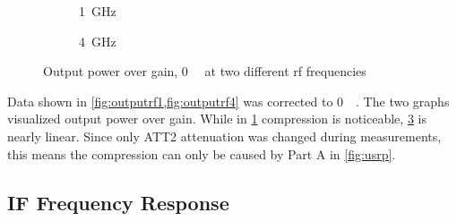 \documentclass[12pt,a4paper,parskip=full,abstracton]{scrartcl}
\begin{document}
\begin{figure}[htb]
    \begin{subfigure}[t]{.5\linewidth}
        \centering
{}
    \caption{\SI{1}{\giga\hertz}}
    \label{fig:outputrf1}
    \end{subfigure}
    \begin{subfigure}[t]{.5\linewidth}
        \centering
{}
    \caption{\SI{4}{\giga\hertz}}
    \label{fig:outputrf4}
    \end{subfigure}
    \caption{Output power over gain, \SI{0}{\deci\belfs} at two different \gls{rf} frequencies}
\end{figure}


Data shown in \cref{fig:outputrf1,fig:outputrf4} was corrected to \SI{0}{\deci\belfs}. The
two graphs visualized output power over gain. While in \cref{fig:outputrf1} compression
is noticeable, \cref{fig:outputrf4} is nearly linear. Since only ATT2 attenuation was
changed during measurements, this means the compression can only be caused by Part A
in \cref{fig:usrp}.

\subsection{IF Frequency Response}
\end{document}
